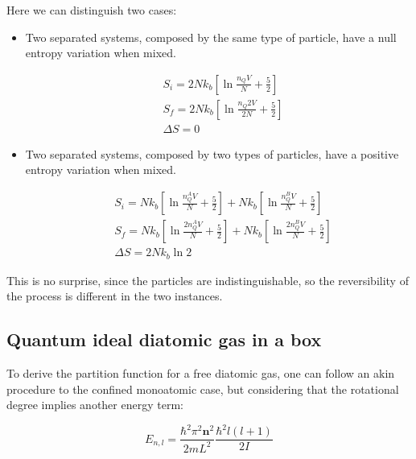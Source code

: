 \documentclass{article}
\begin{document}
Here we can distinguish two cases:

\begin{itemize}
    \item Two separated systems, composed by the same type of particle, have a null entropy variation when mixed.

          \begin{equation}
              \begin{aligned}
                   & S_i=2Nk_b\left[\ln{\frac{n_QV}{N}}+\frac{5}{2}\right]   \\
                   & S_f=2Nk_b\left[\ln{\frac{n_Q2V}{2N}}+\frac{5}{2}\right] \\
                   & \Delta S=0
              \end{aligned}
          \end{equation}

    \item Two separated systems, composed by two types of particles, have a positive entropy variation when mixed.

          \begin{equation}
              \begin{aligned}
                   & S_i=Nk_b\left[\ln{\frac{n_Q^AV}{N}}+\frac{5}{2}\right]+Nk_b\left[\ln{\frac{n_Q^BV}{N}}+\frac{5}{2}\right]    \\
                   & S_f= Nk_b\left[\ln{\frac{2n_Q^AV}{N}}+\frac{5}{2}\right]+Nk_b\left[\ln{\frac{2n_Q^BV}{N}}+\frac{5}{2}\right] \\
                   & \Delta S=2Nk_b\ln{2}
              \end{aligned}
          \end{equation}
\end{itemize}

This is no surprise, since the particles are indistinguishable, so the reversibility of the process is different in the two instances.

\subsection{Quantum ideal diatomic gas in a box}

To derive the partition function for a free diatomic gas, one can follow
an akin procedure to the confined monoatomic case, but considering that the rotational degree implies another energy term:

\begin{equation}
    E_{n,l}=\frac{\hbar^2\pi^2 \textbf{n}^2}{2mL^2}\frac{\hbar^2 l(l+1)}{2I}
\end{equation}
\end{document}
